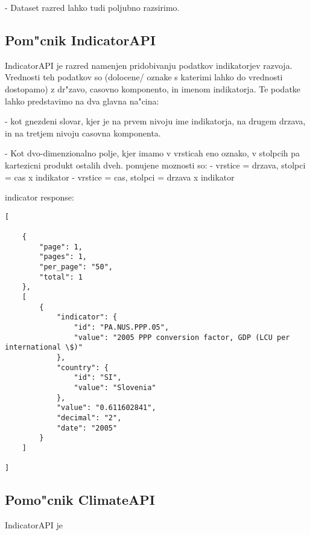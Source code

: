 - Dataset razred lahko tudi poljubno razsirimo.



\subsection{Pom"cnik IndicatorAPI}

IndicatorAPI je razred namenjen pridobivanju podatkov indikatorjev razvoja.
Vrednosti teh podatkov so (dolocene/ oznake s katerimi lahko do vrednosti
dostopamo) z dr"zavo, casovno komponento, in imenom indikatorja. Te podatke
lahko predstavimo na dva glavna na"cina:

 - kot gnezdeni slovar, kjer je na prvem nivoju ime indikatorja, na drugem
   drzava, in na tretjem nivoju casovna komponenta.

 - Kot dvo-dimenzionalno polje, kjer imamo v vrsticah eno oznako, v stolpcih
   pa kartezicni produkt ostalih dveh. ponujene moznosti so:
   - vrstice = drzava, stolpci = cas x indikator
   - vrstice = cas, stolpci = drzava x indikator






% 
% 
% 
% 
% 
% 


indicator response:

\begin{verbatim}
[

    {
        "page": 1,
        "pages": 1,
        "per_page": "50",
        "total": 1
    },
    [
        {
            "indicator": {
                "id": "PA.NUS.PPP.05",
                "value": "2005 PPP conversion factor, GDP (LCU per international \$)"
            },
            "country": {
                "id": "SI",
                "value": "Slovenia"
            },
            "value": "0.611602841",
            "decimal": "2",
            "date": "2005"
        }
    ]

]
\end{verbatim}


\subsection{Pomo"cnik ClimateAPI}

IndicatorAPI je 



% 
% 



